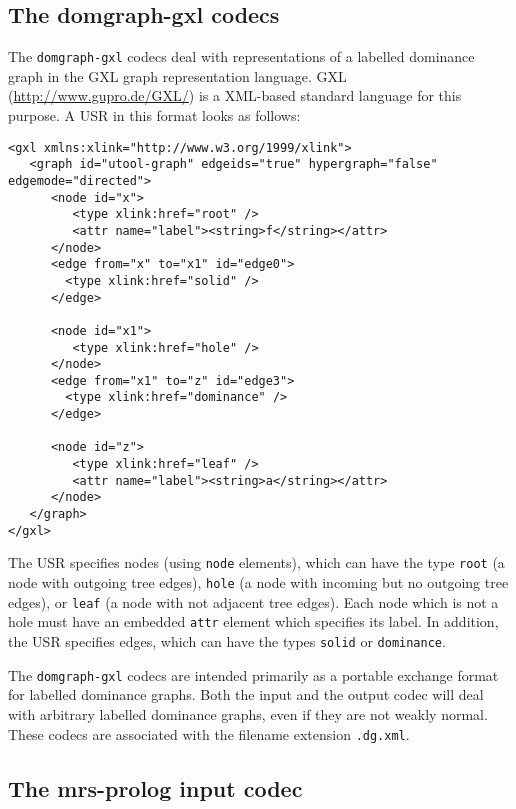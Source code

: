\subsection{The domgraph-gxl codecs}

The \verb?domgraph-gxl? codecs deal with representations of a labelled
dominance graph in the GXL graph representation language. GXL
(\url{http://www.gupro.de/GXL/}) is a XML-based standard language for
this purpose. A USR in this format looks as follows:

\begin{verbatim}
<gxl xmlns:xlink="http://www.w3.org/1999/xlink">
   <graph id="utool-graph" edgeids="true" hypergraph="false" edgemode="directed">
      <node id="x">
         <type xlink:href="root" />
         <attr name="label"><string>f</string></attr>
      </node>
      <edge from="x" to="x1" id="edge0">
        <type xlink:href="solid" />
      </edge>

      <node id="x1">
         <type xlink:href="hole" />
      </node>
      <edge from="x1" to="z" id="edge3">
        <type xlink:href="dominance" />
      </edge>

      <node id="z">
         <type xlink:href="leaf" />
         <attr name="label"><string>a</string></attr>
      </node>
   </graph>
</gxl>
\end{verbatim}

The USR specifies nodes (using \verb?node? elements), which can have
the type \verb?root? (a node with outgoing tree edges), \verb?hole? (a
node with incoming but no outgoing tree edges), or \verb?leaf? (a node
with not adjacent tree edges). Each node which is not a hole must have
an embedded \verb?attr? element which specifies its label. In
addition, the USR specifies edges, which can have the types
\verb?solid? or \verb?dominance?.

The \verb?domgraph-gxl? codecs are intended primarily as a portable
exchange format for labelled dominance graphs. Both the input and the
output codec will deal with arbitrary labelled dominance graphs, even
if they are not weakly normal. These codecs are associated with the
filename extension \verb?.dg.xml?.



\subsection{The mrs-prolog input codec}

\cite{mrs-dom}


